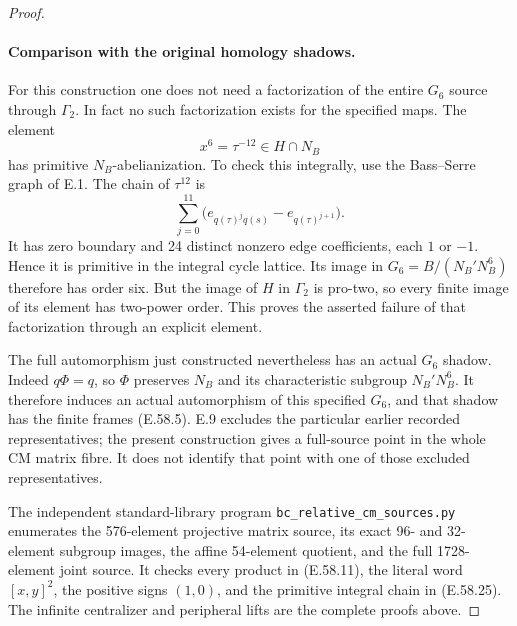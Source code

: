 \begin{proof}
\paragraph{Comparison with the original homology shadows.}
For this construction one does not need a factorization
of the entire \(G_6\) source through \(\Gamma_2\).
In fact no such factorization exists for the specified
maps. The element
\[
              x^6=\tau^{-12}\in H\cap N_B
 \tag{E.58.24}
\]
has primitive \(N_B\)-abelianization. To check this
integrally, use the Bass--Serre graph of E.1. The chain
of \(\tau^{12}\) is
\[
       \sum_{j=0}^{11}
          \bigl(e_{q(\tau)^j q(s)}-e_{q(\tau)^{j+1}}\bigr).
 \tag{E.58.25}
\]
It has zero boundary and 24 distinct nonzero edge
coefficients, each \(1\) or \(-1\). Hence it is
primitive in the integral cycle lattice. Its image
in \(G_6=B/(N_B'N_B^6)\) therefore has order six.
But the image of \(H\) in \(\Gamma_2\) is pro-two,
so every finite image of its element has two-power
order. This proves the asserted failure of that
factorization through an explicit element.

The full automorphism just constructed nevertheless
has an actual \(G_6\) shadow. Indeed \(q\Phi=q\),
so \(\Phi\) preserves \(N_B\) and its characteristic
subgroup \(N_B'N_B^6\). It therefore induces an actual
automorphism of this specified \(G_6\), and that shadow
has the finite frames
\textup{(E.58.5)}. E.9 excludes the particular earlier
recorded representatives; the present construction
gives a full-source point in the whole CM matrix
fibre. It does not identify that point with one of
those excluded representatives.

The independent standard-library program
\texttt{bc\_relative\_cm\_sources.py} enumerates the
576-element projective matrix source, its exact
96- and 32-element subgroup images, the affine
54-element quotient, and the full 1728-element
joint source. It checks every product in
\textup{(E.58.11)}, the literal word
\([x,y]^2\), the positive signs \((1,0)\), and
the primitive integral chain in
\textup{(E.58.25)}. The infinite centralizer and
peripheral lifts are the complete proofs above.
\end{proof}
